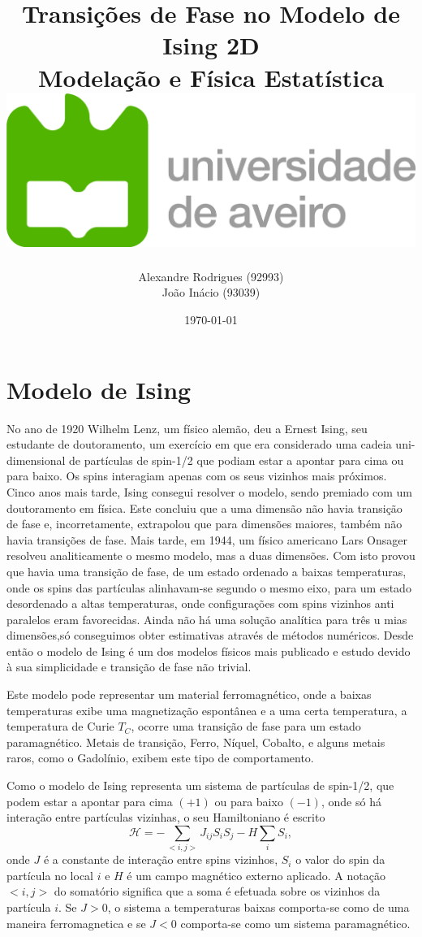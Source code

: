 \documentclass[12pt, a4paper]{article}
\title{
{Transições de Fase no Modelo de Ising 2D}\\
{\large Modelação e Física Estatística}\\ \vspace{3cm}
{\includegraphics[scale=0.5]{Logo_UA.png}}
\vspace{6cm}
}
\author{Alexandre Rodrigues (92993) \\
	João Inácio	(93039)}
\date{\today}
\begin{document}
	\maketitle 
		
	\newpage
	
	\section{Modelo de Ising}
	
	No ano de 1920 Wilhelm Lenz, um físico alemão, deu a Ernest Ising, seu estudante de doutoramento, um exercício em que era considerado uma cadeia uni-dimensional de partículas de spin-1/2 que podiam estar a apontar para cima ou para baixo. Os spins interagiam apenas com os seus vizinhos mais próximos. Cinco anos mais tarde, Ising consegui resolver o modelo, sendo premiado com um doutoramento em física. Este concluiu que a uma dimensão não havia transição de fase e, incorretamente, extrapolou que para dimensões maiores, também não havia transições de fase. Mais tarde, em 1944, um físico americano Lars Onsager resolveu analiticamente o mesmo modelo, mas a duas dimensões. Com isto provou que havia uma transição de fase, de um estado ordenado a baixas temperaturas, onde os spins das partículas alinhavam-se segundo o mesmo eixo, para um estado desordenado a altas temperaturas, onde configurações com spins vizinhos anti paralelos eram favorecidas. Ainda não há uma solução analítica para três u mias dimensões,só conseguimos obter estimativas através de métodos numéricos. Desde então o modelo de Ising é um dos modelos físicos mais publicado e estudo devido à sua simplicidade e transição de fase não trivial.
	
	Este modelo pode representar um material ferromagnético, onde a baixas temperaturas exibe uma magnetização espontânea e a uma certa temperatura, a temperatura de Curie $T_C$, ocorre uma transição de fase para um estado paramagnético. Metais de transição, Ferro, Níquel, Cobalto, e alguns metais raros, como o Gadolínio, exibem este tipo de comportamento.
	
	Como o modelo de Ising representa um sistema de partículas de spin-1/2, que podem estar a apontar para cima $(+1)$ ou para baixo $(-1)$, onde só há interação entre partículas vizinhas, o seu Hamiltoniano é escrito 
\begin{equation}
	\mathcal{H} = -\sum_{<i,j>} J_{ij} S_i S_j - H \sum_iS_i,
\end{equation}
onde $J$ é a constante de interação entre spins vizinhos, $S_i$ o valor do spin da partícula no local $i$ e $H$ é um campo magnético externo aplicado. A notação $<i,j>$ do somatório significa que a soma é efetuada sobre os vizinhos da partícula $i$. Se $J>0$, o sistema a temperaturas baixas comporta-se como de uma maneira ferromagnetica e se $J<0$ comporta-se como um sistema paramagnético.
\end{document}
